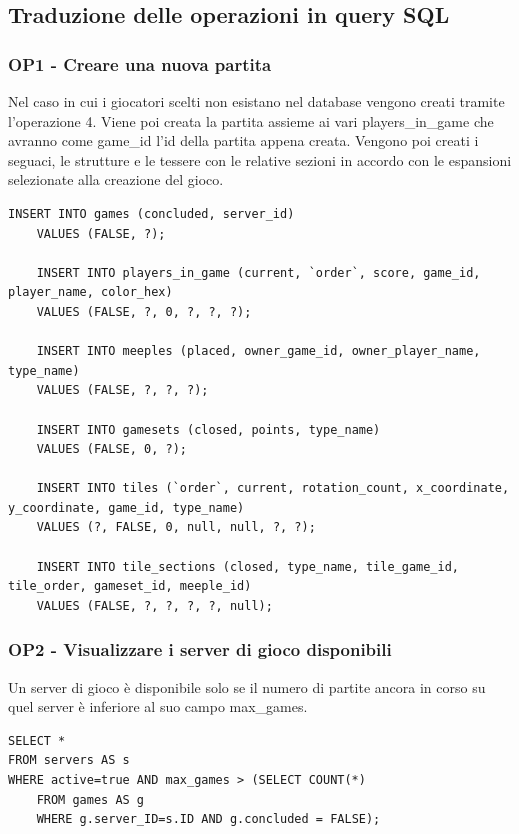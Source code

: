 \subsection{Traduzione delle operazioni in query SQL}
\subsubsection*{OP1 - Creare una nuova partita}
Nel caso in cui i giocatori scelti non esistano nel database vengono creati tramite l'operazione 4. Viene poi creata la partita assieme ai vari players\_in\_game che avranno come game\_id l'id della partita appena creata. Vengono poi creati i seguaci, le strutture e le tessere con le relative sezioni in accordo con le espansioni selezionate alla creazione del gioco.
\medskip

\begin{lstlisting}[style=sql]
    INSERT INTO games (concluded, server_id)
    VALUES (FALSE, ?);

    INSERT INTO players_in_game (current, `order`, score, game_id, player_name, color_hex)
    VALUES (FALSE, ?, 0, ?, ?, ?);

    INSERT INTO meeples (placed, owner_game_id, owner_player_name, type_name)
    VALUES (FALSE, ?, ?, ?);

    INSERT INTO gamesets (closed, points, type_name)
    VALUES (FALSE, 0, ?);

    INSERT INTO tiles (`order`, current, rotation_count, x_coordinate, y_coordinate, game_id, type_name)
    VALUES (?, FALSE, 0, null, null, ?, ?);

    INSERT INTO tile_sections (closed, type_name, tile_game_id, tile_order, gameset_id, meeple_id)
    VALUES (FALSE, ?, ?, ?, ?, null);
\end{lstlisting}

\subsubsection*{OP2 - Visualizzare i server di gioco disponibili}
Un server di gioco è disponibile solo se il numero di partite ancora in corso su quel server è inferiore al suo campo max\_games.
\medskip

\begin{lstlisting}[style=sql]
SELECT *
FROM servers AS s
WHERE active=true AND max_games > (SELECT COUNT(*)
    FROM games AS g
    WHERE g.server_ID=s.ID AND g.concluded = FALSE);
\end{lstlisting}

